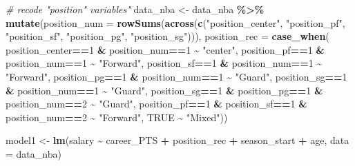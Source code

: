 \documentclass[
]{book}
\newenvironment{Shaded}{\begin{snugshade}}{\end{snugshade}}
\newcommand{\AttributeTok}[1]{\textcolor[rgb]{0.13,0.29,0.53}{#1}}
\newcommand{\CommentTok}[1]{\textcolor[rgb]{0.56,0.35,0.01}{\textit{#1}}}
\newcommand{\ConstantTok}[1]{\textcolor[rgb]{0.56,0.35,0.01}{#1}}
\newcommand{\DecValTok}[1]{\textcolor[rgb]{0.00,0.00,0.81}{#1}}
\newcommand{\FunctionTok}[1]{\textcolor[rgb]{0.13,0.29,0.53}{\textbf{#1}}}
\newcommand{\NormalTok}[1]{#1}
\newcommand{\OtherTok}[1]{\textcolor[rgb]{0.56,0.35,0.01}{#1}}
\newcommand{\SpecialCharTok}[1]{\textcolor[rgb]{0.81,0.36,0.00}{\textbf{#1}}}
\newcommand{\StringTok}[1]{\textcolor[rgb]{0.31,0.60,0.02}{#1}}
\begin{document}
\begin{Shaded}
\begin{Highlighting}[]
\CommentTok{\# recode "position" variables"}
\NormalTok{data\_nba }\OtherTok{\textless{}{-}}\NormalTok{ data\_nba }\SpecialCharTok{\%\textgreater{}\%}
  \FunctionTok{mutate}\NormalTok{(}\AttributeTok{position\_num =} \FunctionTok{rowSums}\NormalTok{(}\FunctionTok{across}\NormalTok{(}\FunctionTok{c}\NormalTok{(}\StringTok{"position\_center"}\NormalTok{, }\StringTok{"position\_pf"}\NormalTok{, }\StringTok{"position\_sf"}\NormalTok{,}
                                         \StringTok{"position\_pg"}\NormalTok{, }\StringTok{"position\_sg"}\NormalTok{))),}
         \AttributeTok{position\_rec =} 
           \FunctionTok{case\_when}\NormalTok{(}
\NormalTok{             position\_center}\SpecialCharTok{==}\DecValTok{1} \SpecialCharTok{\&}\NormalTok{ position\_num}\SpecialCharTok{==}\DecValTok{1} \SpecialCharTok{\textasciitilde{}} \StringTok{"center"}\NormalTok{,}
\NormalTok{             position\_pf}\SpecialCharTok{==}\DecValTok{1} \SpecialCharTok{\&}\NormalTok{ position\_num}\SpecialCharTok{==}\DecValTok{1} \SpecialCharTok{\textasciitilde{}} \StringTok{"Forward"}\NormalTok{,}
\NormalTok{             position\_sf}\SpecialCharTok{==}\DecValTok{1} \SpecialCharTok{\&}\NormalTok{ position\_num}\SpecialCharTok{==}\DecValTok{1} \SpecialCharTok{\textasciitilde{}} \StringTok{"Forward"}\NormalTok{,}
\NormalTok{             position\_pg}\SpecialCharTok{==}\DecValTok{1} \SpecialCharTok{\&}\NormalTok{ position\_num}\SpecialCharTok{==}\DecValTok{1} \SpecialCharTok{\textasciitilde{}} \StringTok{"Guard"}\NormalTok{,}
\NormalTok{             position\_sg}\SpecialCharTok{==}\DecValTok{1} \SpecialCharTok{\&}\NormalTok{ position\_num}\SpecialCharTok{==}\DecValTok{1} \SpecialCharTok{\textasciitilde{}} \StringTok{"Guard"}\NormalTok{,}
\NormalTok{             position\_sg}\SpecialCharTok{==}\DecValTok{1} \SpecialCharTok{\&}\NormalTok{ position\_pg}\SpecialCharTok{==}\DecValTok{1} \SpecialCharTok{\&}\NormalTok{ position\_num}\SpecialCharTok{==}\DecValTok{2} \SpecialCharTok{\textasciitilde{}} \StringTok{"Guard"}\NormalTok{,}
\NormalTok{             position\_pf}\SpecialCharTok{==}\DecValTok{1} \SpecialCharTok{\&}\NormalTok{ position\_sf}\SpecialCharTok{==}\DecValTok{1} \SpecialCharTok{\&}\NormalTok{ position\_num}\SpecialCharTok{==}\DecValTok{2} \SpecialCharTok{\textasciitilde{}} \StringTok{"Forward"}\NormalTok{,}
             \ConstantTok{TRUE} \SpecialCharTok{\textasciitilde{}} \StringTok{"Mixed"}\NormalTok{))}

\NormalTok{model1 }\OtherTok{\textless{}{-}} \FunctionTok{lm}\NormalTok{(salary }\SpecialCharTok{\textasciitilde{}}\NormalTok{ career\_PTS }\SpecialCharTok{+}\NormalTok{ position\_rec }\SpecialCharTok{+}\NormalTok{ season\_start }\SpecialCharTok{+}
\NormalTok{             age, }\AttributeTok{data =}\NormalTok{ data\_nba)}


\end{Highlighting}
\end{Shaded}
\end{document}
